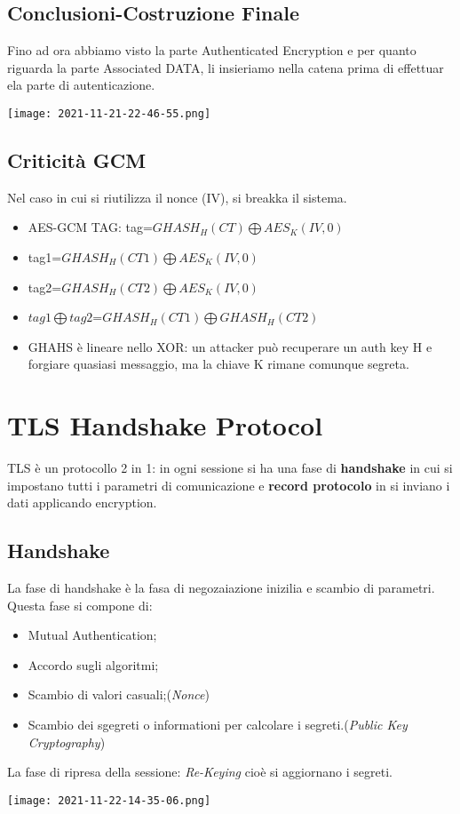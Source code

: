 \documentclass{article}
\theoremstyle{remark}
\begin{document}
\subsection{Conclusioni-Costruzione Finale}
Fino ad ora abbiamo visto la parte Authenticated Encryption e per quanto riguarda la parte Associated DATA, li insieriamo nella catena prima di
effettuar ela parte di autenticazione.
\begin{center}
	\texttt{[image: 2021-11-21-22-46-55.png]}
\end{center}
\subsection{Criticità GCM}
Nel caso in cui si riutilizza il nonce (IV), si breakka il sistema.
\begin{itemize}
	\item AES-GCM TAG: tag=\( GHASH_H(CT)\bigoplus AES_K(IV,0)\)
	\item tag1=\( GHASH_H(CT1)\bigoplus AES_K(IV,0)\)
	\item tag2=\( GHASH_H(CT2)\bigoplus AES_K(IV,0)\)
	\item \(tag1\bigoplus tag2\)=\( GHASH_H(CT1)\bigoplus GHASH_H(CT2)\)
	\item GHAHS è lineare nello XOR: un attacker può recuperare un auth key H e forgiare quasiasi messaggio, ma la chiave K rimane comunque segreta.
\end{itemize}
\section{TLS Handshake Protocol}
TLS è un protocollo 2 in 1: in ogni sessione si ha una fase di \textbf{handshake} in cui si impostano tutti i parametri di comunicazione e \textbf{record protocolo} in
si inviano i dati applicando encryption.
\subsection{Handshake}
La fase di handshake è la fasa di negozaiazione inizilia e scambio di parametri. Questa fase si compone di:
\begin{itemize}
	\item Mutual Authentication;
	\item Accordo sugli algoritmi;
	\item Scambio di valori casuali;(\emph{Nonce})
	\item Scambio dei sgegreti o informationi per calcolare i segreti.(\emph{Public Key Cryptography})
\end{itemize}
La fase di ripresa della sessione: \emph{Re-Keying} cioè si aggiornano i segreti.
\begin{center}
	\texttt{[image: 2021-11-22-14-35-06.png]}
\end{center}
\end{document}
